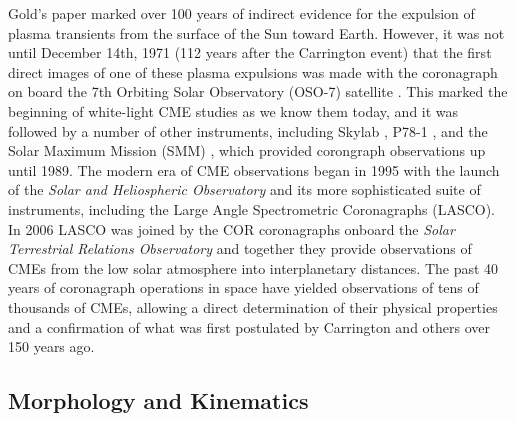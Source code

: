 Gold's paper marked over 100 years of indirect evidence for the expulsion of plasma transients from the surface of the Sun toward Earth. However, it was not until December 14th, 1971 (112 years after the Carrington event) that the first direct images of one of these plasma expulsions was made with the coronagraph on board the 7th Orbiting Solar Observatory (OSO-7) satellite \citep{tousey1971}. This marked the beginning of white-light CME studies as we know them today, and it was followed by a number of other instruments, including Skylab \citep{macqueen1980}, P78-1 \citep{sheeley1980}, and the Solar Maximum Mission (SMM) \citep{hundhausen1999}, which provided corongraph observations up until 1989. The modern era of CME observations began in 1995 with the launch of the \emph{Solar and Heliospheric Observatory} \citep[\emph{SOHO};][]{dom95} and its more sophisticated suite of instruments, including the Large Angle Spectrometric Coronagraphs (LASCO). In 2006 LASCO was joined by the COR coronagraphs onboard the \emph{Solar Terrestrial Relations Observatory} \citep[\emph{STEREO};][]{kai08} and together they provide observations of CMEs from the low solar atmosphere into interplanetary distances. The past 40 years of coronagraph operations in space have yielded observations of tens of thousands of CMEs, allowing a direct determination of their physical properties and a confirmation of what was first postulated by Carrington and others over 150 years ago.

\subsection{Morphology and Kinematics} 


